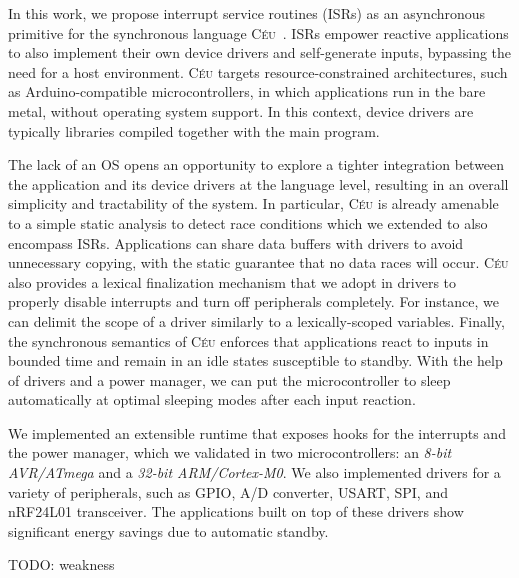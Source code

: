 \documentclass[sigplan,10pt,review,anonymous]{acmart}\settopmatter{printfolios=true,printccs=false,printacmref=false}
\newcommand{\CEU}{\textsc{C\'{e}u}\xspace}
\begin{document}
In this work, we propose interrupt service routines (ISRs) as an asynchronous
primitive for the synchronous language \CEU~\cite{ceu.sensys13}.
ISRs empower reactive applications to also implement their own device drivers
and self-generate inputs, bypassing the need for a host environment.
%
\CEU targets resource-constrained architectures, such as Arduino-compatible
microcontrollers, in which applications run in the bare metal, without
operating system support.
In this context, device drivers are typically libraries compiled together with
the main program.

The lack of an OS opens an opportunity to explore a tighter integration between
the application and its device drivers at the language level, resulting in an
overall simplicity and tractability of the system.
%
In particular, \CEU is already amenable to a simple static analysis to detect
race conditions which we extended to also encompass ISRs.
Applications can share data buffers with drivers to avoid unnecessary copying,
with the static guarantee that no data races will occur.
%
\CEU also provides a lexical finalization mechanism that we adopt in drivers to
properly disable interrupts and turn off peripherals completely.
For instance, we can delimit the scope of a driver similarly to a
lexically-scoped variables.
%
Finally, the synchronous semantics of \CEU enforces that applications react
to inputs in bounded time and remain in an idle states susceptible to standby.
With the help of drivers and a power manager, we can put the microcontroller to
sleep automatically at optimal sleeping modes after each input reaction.

We implemented an extensible runtime that exposes hooks for the interrupts and
the power manager, which we validated in two microcontrollers: an
\emph{8-bit AVR/ATmega} and a \emph{32-bit ARM/Cortex-M0}.
%
We also implemented drivers for a variety of peripherals, such as GPIO, A/D
converter, USART, SPI, and nRF24L01 transceiver.
%
The applications built on top of these drivers show significant energy savings
due to automatic standby.

TODO: weakness
\end{document}
